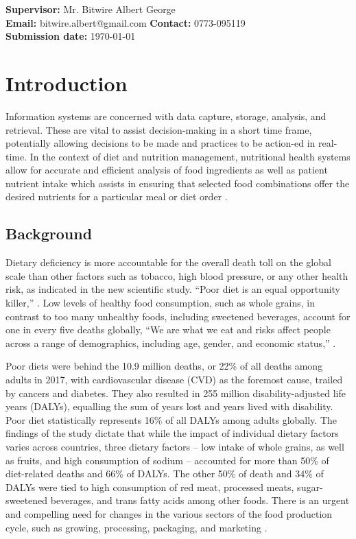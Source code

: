 \documentclass{article}
\begin{document}
\begin{center}
\vspace{60pt} 
\textbf{Supervisor:} Mr. Bitwire Albert George \\
\textbf{Email:} bitwire.albert@gmail.com \hspace{1cm} \textbf{Contact:} 0773-095119 \\
\textbf{Submission date:} \today

\end{center}

\newpage

\section{Introduction}
\label{Introducion}
Information systems are concerned with data capture, storage, analysis, and retrieval. These are vital to assist decision-making in a short time frame, potentially allowing decisions to be made and practices to be action-ed in real-time.  In the context of diet and nutrition management, nutritional health systems allow for accurate and efficient analysis of food ingredients as well as patient nutrient intake which assists in ensuring that selected food combinations offer the desired nutrients for a particular meal or diet order \cite{DFM}. 


\subsection{Background}
Dietary deficiency is more accountable for the overall death toll on the global scale than other factors such as tobacco, high blood pressure, or any other health risk, as indicated in the new scientific study. “Poor diet is an equal opportunity killer,” \cite{ihme2019new}. Low levels of healthy food consumption, such as whole grains, in contrast to too many unhealthy foods, including sweetened beverages, account for one in every five deaths globally, “We are what we eat and risks affect people across a range of demographics, including age, gender, and economic status,” \cite{ihme2019new}.

Poor diets were behind the 10.9 million deaths, or 22\% of all deaths among adults in 2017, with cardiovascular disease (CVD) as the foremost cause, trailed by cancers and diabetes. They also resulted in 255 million disability-adjusted life years (DALYs), equalling the sum of years lost and years lived with disability. Poor diet statistically represents 16\% of all DALYs among adults globally. The findings of the study dictate that while the impact of individual dietary factors varies across countries, three dietary factors – low intake of whole grains, as well as fruits, and high consumption of sodium – accounted for more than 50\% of diet-related deaths and 66\% of DALYs. The other 50\% of death and 34\% of DALYs were tied to high consumption of red meat, processed meats, sugar-sweetened beverages, and trans fatty acids among other foods. There is an urgent and compelling need for changes in the various sectors of the food production cycle, such as growing, processing, packaging, and marketing \cite{ihme2019new}.
\end{document}
